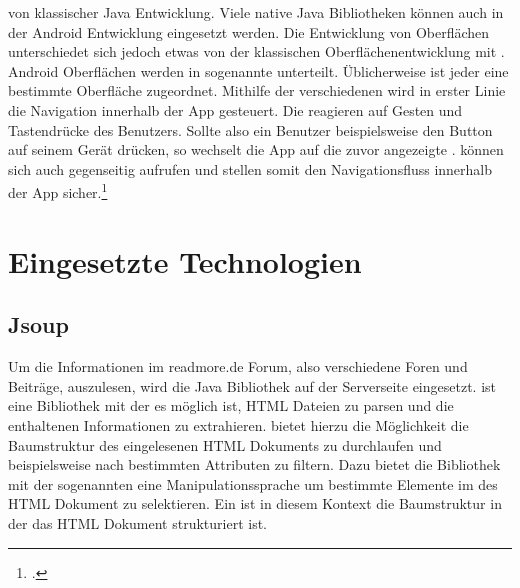 von klassischer Java Entwicklung. Viele native Java Bibliotheken können auch in
der Android Entwicklung eingesetzt werden. Die Entwicklung von Oberflächen
unterschiedet sich jedoch etwas von der klassischen Oberflächenentwicklung mit
. Android Oberflächen werden in sogenannte
 unterteilt. Üblicherweise ist jeder
 eine bestimmte Oberfläche zugeordnet. Mithilfe der
verschiedenen  wird in erster Linie die Navigation
innerhalb der App gesteuert. Die  reagieren auf Gesten
und Tastendrücke des Benutzers. Sollte also ein Benutzer beispielsweise den
 Button auf seinem Gerät drücken, so wechselt die App auf
die zuvor angezeigte .  können
sich auch gegenseitig aufrufen und stellen somit
den Navigationsfluss innerhalb der App sicher.\footcite{künneth2012android}

\section{Eingesetzte Technologien}
\subsection{Jsoup}
Um die Informationen im readmore.de Forum, also verschiedene Foren und Beiträge,
auszulesen, wird die Java Bibliothek  auf der
Serverseite eingesetzt.
 ist eine Bibliothek mit der es möglich ist, HTML Dateien zu
parsen und die enthaltenen Informationen zu extrahieren. 
bietet hierzu die Möglichkeit die Baumstruktur des eingelesenen HTML Dokuments
zu durchlaufen und beispielsweise nach bestimmten Attributen zu filtern. Dazu
bietet die Bibliothek mit der sogenannten  eine
Manipulationssprache um bestimmte Elemente im  des HTML
Dokument zu selektieren. Ein  ist in diesem Kontext die 
Baumstruktur in der das HTML Dokument strukturiert ist. \\
